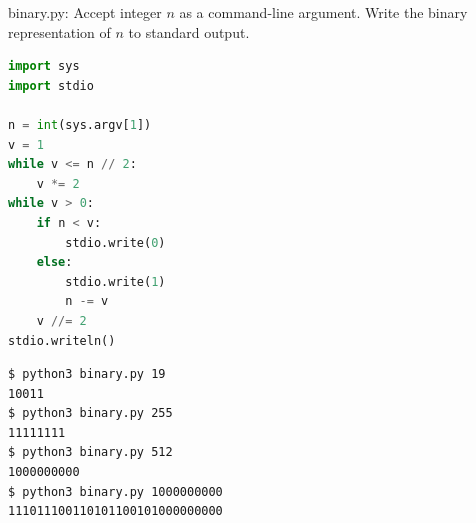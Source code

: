 \documentclass[8pt,a4paper,compress]{beamer}
\begin{document}
\begin{frame}[fragile]
\pause

\begin{framed}
\tiny binary.py: Accept integer $n$ as a command-line argument. Write the binary representation of $n$ to standard output.
\end{framed}

\begin{minipage}{150pt}
\begin{lstlisting}[language=Python]
import sys
import stdio

n = int(sys.argv[1])
v = 1
while v <= n // 2:
    v *= 2
while v > 0:
    if n < v:
        stdio.write(0)
    else:
        stdio.write(1)
        n -= v
    v //= 2
stdio.writeln()
\end{lstlisting}

\end{minipage}%
\begin{minipage}{150pt}
\hfill {}
\end{minipage}

\pause

\begin{lstlisting}[language={}]
$ python3 binary.py 19
10011
$ python3 binary.py 255
11111111
$ python3 binary.py 512
1000000000
$ python3 binary.py 1000000000
111011100110101100101000000000
\end{lstlisting}
\end{frame}
\end{document}
